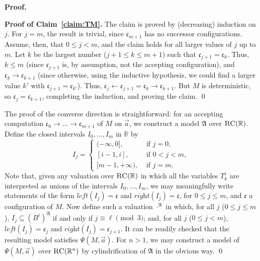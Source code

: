 \documentclass{LMCS}
\newenvironment{proofof}[1]{\par\noindent\textbf{Proof of {#1}.}}{\mbox{}\qed\par\medskip}
\renewenvironment{proof}{\par\noindent\textbf{Proof.}}{\mbox{}\qed\par\medskip}
\theoremstyle{plain}
\newcommand{\fA}{\mathfrak{A}}\newcommand{\fB}{\mathfrak{B}}\newcommand{\fM}{\mathfrak{M}}\newcommand{\cK}{\mathcal{K}}\newcommand{\R}{\mathbb{R}}\newcommand{\cR}{\mathcal{R}}\newcommand{\cL}{\mathcal{L}}\newcommand{\cLc}{\mathcal{L}c}\newcommand{\cLcc}{\mathcal{L}cc}
\begin{document}
\begin{proof}
\begin{proofof}{Claim~\ref{claim:TM}}
The claim is proved by
(decreasing) induction on $j$. For $j = m$, the result is trivial,
since $\mathfrak c_{m+1}$ has no successor configurations. Assume, then,
that $0 \leq j < m$, and the claim holds for all larger values of
$j$ up to $m$. Let $k$ be the largest number ($j+1 \leq k \leq m +1$)
such that $\mathfrak c_{j+1} = \mathfrak c_k$. Thus, $k \leq m$ (since
$\mathfrak c_{j+1}$ is, by assumption, not the accepting configuration), and $\mathfrak
c_k \rightarrow \mathfrak c_{k+1}$ (since otherwise, using the
inductive hypothesis, we could find a larger value $k'$ with
$\mathfrak c_{j+1} = \mathfrak c_{k'}$).  Thus, $\mathfrak c_j
\leftarrow \mathfrak c_{j+1} = \mathfrak c_k \rightarrow \mathfrak
c_{k+1}$. But $M$ is deterministic, so $\mathfrak c_j = \mathfrak
c_{k+1}$, completing the induction, and proving the claim.
\end{proofof}





The proof of the converse direction is straightforward: for an accepting
computation $\mathfrak c_0 \to \dots \to \mathfrak c_{m+1}$ of $M$ on
$\vec{a}$, we construct a model $\mathfrak{A}$ over $\RegC(\R)$.
Define the closed intervals $I_0, \ldots, I_m$ in $\R$ by
\begin{equation*}
I_j = \begin{cases} (-\infty,0], & \text{ if } j =0, \\
[i-1, i], & \text{ if } 0 < j < m,\\
[m-1,+\infty), & \text{ if } j = m.
\end{cases}
\end{equation*}
Note that, given any valuation over $\RegC(\R)$ in which all the
variables $T_k^i$ are interpreted as unions of the intervals $I_0,
\ldots, I_m$, we may meaningfully write statements of the form
$\textit{left}(I_j)= \mathfrak{c}$ and $\textit{right}(I_j)=
\mathfrak{c}$, for $0 \leq j \leq m$, and $\mathfrak{c}$ a
configuration of $M$. Now define such a valuation
$\cdot^{\mathfrak{A}}$ in which, for all $j$ ($0 \leq j \leq m$), $I_j
\subseteq (B^\ell)^\mathfrak{A}$ if and only if $j \equiv \ell \pmod 3$; and, for
all $j$ ($0 \leq j < m$), $\textit{left}(I_j)= \mathfrak{c}_j$ and
$\textit{right}(I_j) = \mathfrak c_{j+1}$. It can be readily checked
that the resulting model satisfies $\Psi(M,\vec{a})$. For $n> 1$, we
may construct a model of $\Psi(M,\vec{a})$ over $\RegC(\R^n)$ by
cylindrification of $\fA$ in the obvious way.
\end{proof}
\end{document}
